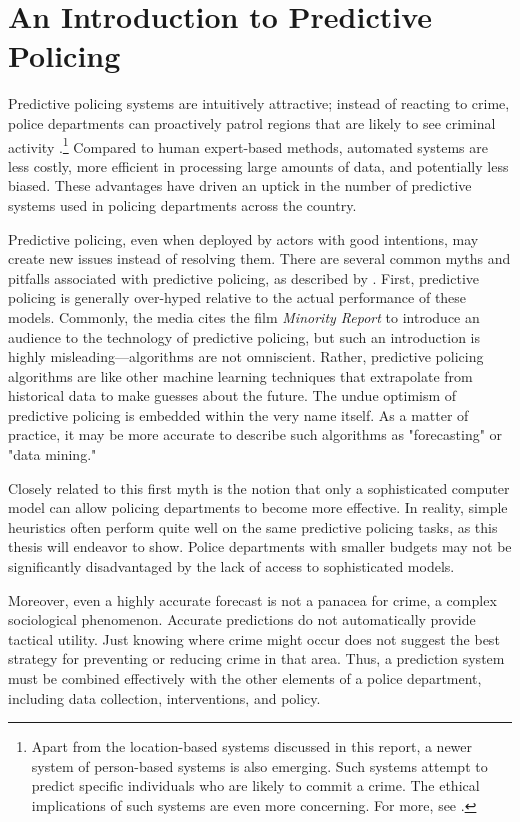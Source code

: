 \section{An Introduction to Predictive Policing}

Predictive policing systems are intuitively attractive; instead of reacting to crime, police departments can proactively patrol regions that are likely to see criminal activity \citep{perry_predictive_2013}.\footnote{Apart from the location-based systems discussed in this report, a newer system of person-based systems is also emerging. Such systems attempt to predict specific individuals who are likely to commit a crime. The ethical implications of such systems are even more concerning. For more, see \citet{robinson_stuck_2016}.} Compared to human expert-based methods, automated systems are less costly, more efficient in processing large amounts of data, and potentially less biased. These advantages have driven an uptick in the number of predictive systems used in policing departments across the country.

Predictive policing, even when deployed by actors with good intentions, may create new issues instead of resolving them. There are several common myths and pitfalls associated with predictive policing, as described by \citet{perry_predictive_2013}. First, predictive policing is generally over-hyped relative to the actual performance of these models. Commonly, the media cites the film \emph{Minority Report} to introduce an audience to the technology of predictive policing, but such an introduction is highly misleading---algorithms are not omniscient. Rather, predictive policing algorithms are like other machine learning techniques that extrapolate from historical data to make guesses about the future. The undue optimism of predictive policing is embedded within the very name itself. As a matter of practice, it may be more accurate to describe such algorithms as "forecasting" or "data mining."

Closely related to this first myth is the notion that only a sophisticated computer model can allow policing departments to become more effective. In reality, simple heuristics often perform quite well on the same predictive policing tasks, as this thesis will endeavor to show. Police departments with smaller budgets may not be significantly disadvantaged by the lack of access to sophisticated models.

Moreover, even a highly accurate forecast is not a panacea for crime, a complex sociological phenomenon. Accurate predictions do not automatically provide tactical utility. Just knowing where crime might occur does not suggest the best strategy for preventing or reducing crime in that area. Thus, a prediction system must be combined effectively with the other elements of a police department, including data collection, interventions, and policy.

